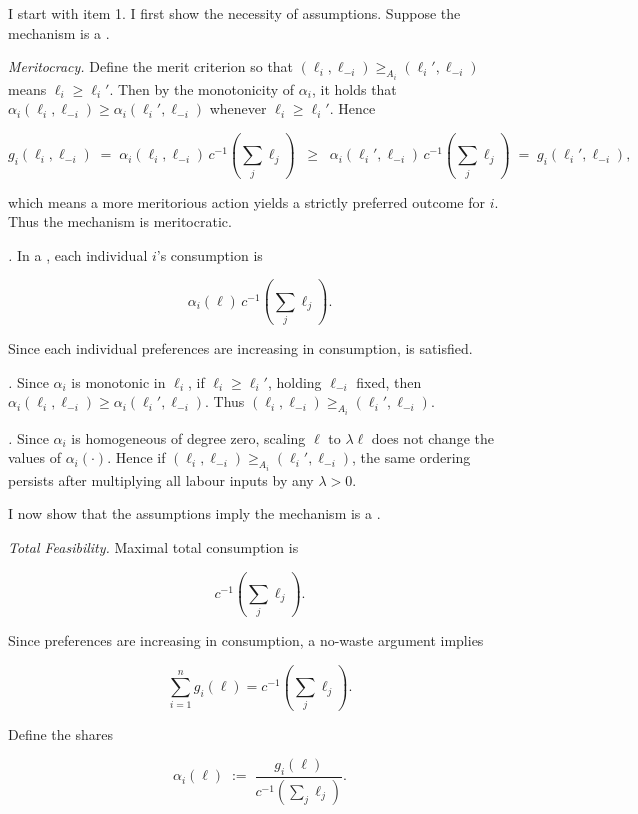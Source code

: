 \begin{propproof}
	I start with item 1. I first show the necessity of assumptions. Suppose the mechanism is a .

	\emph{Meritocracy.} Define the merit criterion so that \((\ell_i,\ell_{-i}) \ge_{A_i} (\ell_i',\ell_{-i})\) means \(\ell_i\ge\ell_i'\). Then by the monotonicity of \(\alpha_i\), it holds that \(\alpha_i(\ell_i,\ell_{-i}) \ge \alpha_i(\ell_i',\ell_{-i})\) whenever \(\ell_i\ge\ell_i'\). Hence

	\[
		g_i(\ell_i,\ell_{-i})
		\;=\;\alpha_i(\ell_i,\ell_{-i})\,c^{-1} \left(\sum_j \ell_j\right)
		\;\;\ge\;\;
		\alpha_i(\ell_i',\ell_{-i})\,c^{-1} \left(\sum_j \ell_j\right)
		\;=\;g_i(\ell_i',\ell_{-i}),
	\]

	which means a more meritorious action yields a strictly preferred outcome for \(i\). Thus the mechanism is meritocratic.

	\emph{.}
	In a , each individual \(i\)'s consumption is

	\[ \alpha_i(\ell)\,c^{-1} \left( \sum_j\ell_j \right) . \]

	Since each individual preferences are increasing in consumption,  is satisfied.

	\emph{.}
	Since \(\alpha_i\) is monotonic in \(\ell_i\), if \(\ell_i\ge\ell_i'\), holding \(\ell_{-i}\) fixed,  then \(\alpha_i(\ell_i,\ell_{-i}) \ge \alpha_i(\ell_i',\ell_{-i})\). Thus \((\ell_i,\ell_{-i}) \ge_{A_i} (\ell_i',\ell_{-i})\).

	\emph{.}
	Since \(\alpha_i\) is homogeneous of degree zero, scaling \(\ell \) to \( \lambda \ell \) does not change the values of \(\alpha_i(\cdot)\). Hence if \((\ell_i,\ell_{-i}) \ge_{A_i} (\ell_i',\ell_{-i})\),	the same ordering persists after multiplying all labour inputs by any \(\lambda>0\).

	I now show that the assumptions imply the mechanism is a .

	\emph{Total Feasibility.}
	Maximal total consumption is

	\[ c^{-1} \left( \sum_j \ell_j \right) .\]

	Since preferences are increasing in consumption, a no-waste argument implies

	\[ \sum_{i=1}^n g_i(\ell)= c^{-1} \left( \sum_j \ell_j \right) .\]

	Define the shares

	\[
		\alpha_i(\ell)
		\;:=\;
		\frac{\,g_i(\ell)\,}
		{c^{-1} \left( \sum_j\ell_j \right)}.
	\]


\end{propproof}
